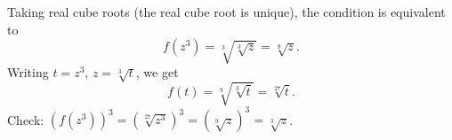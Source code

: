 Taking real cube roots (the real cube root is unique), the condition is equivalent to
\[
f\left(z^3\right)=\sqrt[3]{\sqrt[3]z}=\sqrt[9]{z}.
\]
Writing $t=z^3$, $z=\sqrt[3]t$, we get
\[
f(t)=\sqrt[9]{\sqrt[3]t}=\boxed{\sqrt[27]{t}} .
\]
Check: $\left(f\left(z^3\right)\right)^3=\left(\sqrt[27]{z^3}\right)^3=\left(\sqrt[9]{z}\right)^3=\sqrt[3]z$.
